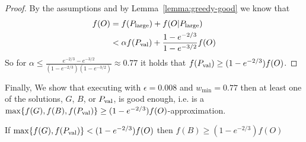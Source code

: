 \begin{proof}
	By the assumptions and by Lemma~\ref{lemma:greedy-good} we know that 
	\begin{align}
		f(O)	& = f(P_{\text{large}}) + f(O|P_{\text{large}}) 
		\\ 		& < \alpha f(P_{\text{val}}) + \frac{1-e^{-2/3}}{1-e^{-3/2}}f(O)
	\end{align}
	So for $\alpha \leq \frac{e^{-2/3} - e^{-3/2}}{(1-e^{-2/3})(1-e^{-3/2})} \approx 0.77$ it holds that $f(P_{\text{val}}) \geq (1 - e^{-2/3})f(O)$.
\end{proof}

Finally, We show that executing \BOTAlg{} with $\epsilon = 0.008$ and $w_{\min} = 0.77$ then at least one of the solutions, $G$, $B$, or $P_{\text{val}}$, is good enough, i.e. is a $\max\{f(G), f(B), f(P_{\text{val}})\} \geq (1 - e^{-2/3})f(O)$-approximation.

\begin{theorem}
	\label{theorem:mmgreedy-or-bucket}
	If $\max\{f(G), f(P_{\text{val}})\} < (1 - e^{-2/3})f(O)$ then $f(B) \geq (1 - e^{-2/3})f(O)$
\end{theorem}

